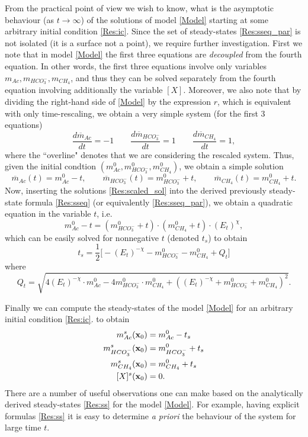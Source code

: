 \documentclass[a4paper, 12pt]{article}
\begin{document}
From the practical point of view we wish to know, what is the asymptotic behaviour (as $t\to \infty $) of the solutions of model \eqref{Model} starting at some arbitrary initial condition \eqref{Res:ic}. Since the set of steady-states \eqref{Res:sseq_par} is not isolated (it is a surface not a point), we require further investigation.  First we note that in model \eqref{Model} the first three equations are \emph{decoupled} from the fourth equation. In other words, the first three equations involve only  variables $m_{Ac}, m_{HCO_3^-}, m_{CH_4}$, and thus they can be solved separately from the fourth equation involving additionally the variable $[X]$.  Moreover, we also note that by dividing the right-hand side of \eqref{Model} by the expression $r$, which is equivalent with only time-rescaling, we obtain a very simple system (for the first 3 equations)
\begin{equation}\label{Res:scaled}
\frac{d\overline m_{Ac}}{dt} = -1\qquad \frac{d\overline m_{HCO_3^-}}{dt} = 1\qquad  \frac{d\overline m_{CH_4}}{dt} = 1,
\end{equation}
where the ``overline" denotes that we are considering the rescaled system. Thus, given the initial condtion $(m^0_{Ac}, m^0_{HCO_3^-}, m^0_{CH_4})$, we obtain a simple solution
\begin{equation}\label{Res:scaled_sol}
\overline m_{Ac}(t) = m^0_{Ac}-t, \qquad \overline m_{HCO_3^-}(t)=m^0_{HCO_3^-}+t, \qquad \overline m_{CH_4}(t) = m^0_{CH_4}+t.
\end{equation}
Now, inserting the solutions \eqref{Res:scaled_sol} into the derived previously steady-state formula \eqref{Res:sseq} (or equivalently \eqref{Res:sseq_par}), we obtain a quadratic equation in the variable $t$, i.e. 
\[
m^0_{Ac}-t = (m^0_{HCO_3^-}+t)\cdot  (m^0_{CH_4}+t) \cdot (E_t)^{\chi},
\]
which can be easily solved for nonnegative $t$ (denoted $t_s$) to obtain
\begin{equation}\label{Res:t}
t_s=\frac{1}{2}\Big[-(E_t)^{-\chi}-m^0_{HCO_3^-}-m^0_{CH_4}+Q_t\Big]
\end{equation}
where
\[
Q_t = \sqrt{4 (E_t)^{-\chi}\cdot m^0_{Ac}-4m^0_{HCO_3^-}\cdot m^0_{CH_4} + ((E_t)^{-\chi}+m^0_{HCO_3^-}+m^0_{CH_4})^2}.
\]

Finally we can compute the steady-states of the model \eqref{Model} for an arbitrary initial condition \eqref{Res:ic}. to obtain
\begin{equation}\label{Res:ss}
\begin{aligned}
m^{s}_{Ac}(\mathbf{x}_0) 		&= m^0_{Ac} 			- t_s\\
m^{s}_{HCO_3^-}(\mathbf{x}_0) 	&= m^0_{HCO_3^-} 		+ t_s\\
m^{s}_{CH_4}(\mathbf{x}_0)	&= m^0_{CH_4}		+ t_s\\
[X]^{s}(\mathbf{x}_0) 			&= 0.
\end{aligned}
\end{equation}
There are a number of useful observations one can make based on the analytically derived steady-states \eqref{Res:ss} for the model \eqref{Model}. For example, having explicit formulas \eqref{Res:ss} it is easy to determine \emph{a priori} the behaviour of the system for large time $t$. 
\end{document}
